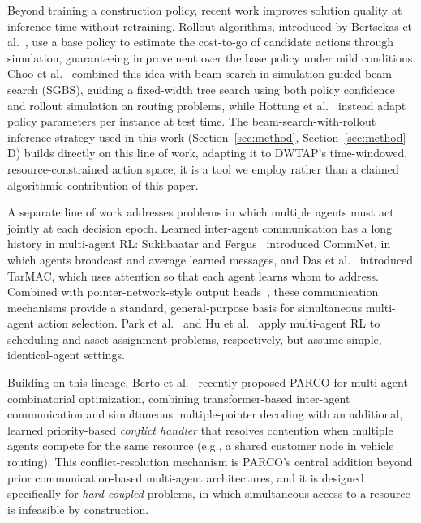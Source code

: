 \documentclass[smallcondensed]{svjour3}
\begin{document}
Beyond training a construction policy, recent work improves solution quality at inference time without retraining. Rollout algorithms, introduced by Bertsekas et al.~\cite{bertsekas1997rollout}, use a base policy to estimate the cost-to-go of candidate actions through simulation, guaranteeing improvement over the base policy under mild conditions. Choo et al.~\cite{choo2022sgbs} combined this idea with beam search in simulation-guided beam search (SGBS), guiding a fixed-width tree search using both policy confidence and rollout simulation on routing problems, while Hottung et al.~\cite{hottung2022eas} instead adapt policy parameters per instance at test time. The beam-search-with-rollout inference strategy used in this work (Section~\ref{sec:method}, Section~\ref{sec:method}-D) builds directly on this line of work, adapting it to DWTAP's time-windowed, resource-constrained action space; it is a tool we employ rather than a claimed algorithmic contribution of this paper.

A separate line of work addresses problems in which multiple agents must act jointly at each decision epoch. Learned inter-agent communication has a long history in multi-agent RL: Sukhbaatar and Fergus~\cite{sukhbaatar2016commnet} introduced CommNet, in which agents broadcast and average learned messages, and Das et al.~\cite{das2019tarmac} introduced TarMAC, which uses attention so that each agent learns whom to address. Combined with pointer-network-style output heads~\cite{vinyals2015pointer}, these communication mechanisms provide a standard, general-purpose basis for simultaneous multi-agent action selection. Park et al.~\cite{park2021schedulenet} and Hu et al.~\cite{hu2024} apply multi-agent RL to scheduling and asset-assignment problems, respectively, but assume simple, identical-agent settings.

Building on this lineage, Berto et al.~\cite{parco2024} recently proposed PARCO for multi-agent combinatorial optimization, combining transformer-based inter-agent communication and simultaneous multiple-pointer decoding with an additional, learned priority-based \emph{conflict handler} that resolves contention when multiple agents compete for the same resource (e.g., a shared customer node in vehicle routing). This conflict-resolution mechanism is PARCO's central addition beyond prior communication-based multi-agent architectures, and it is designed specifically for \emph{hard-coupled} problems, in which simultaneous access to a resource is infeasible by construction.
\end{document}
